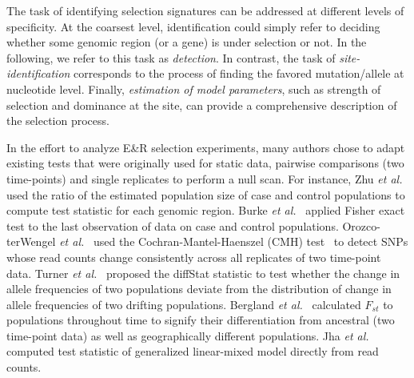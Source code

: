 \documentclass[9pt,twocolumn,twoside]{gsajnl}
\begin{document}
The task of identifying selection signatures can be addressed at
different levels of specificity. At the coarsest level, identification
could simply refer to deciding whether some genomic region (or a gene)
is under selection or not. In the following, we refer to this task as
\emph{detection}. In contrast, the task of \emph{site-identification}
corresponds to the process of finding the favored mutation/allele at
nucleotide level. Finally, \emph{estimation of model parameters}, such
as strength of selection and dominance at the site, can provide a
comprehensive description of the selection process.


In the effort to analyze E\&R selection experiments, many authors
chose to adapt existing tests that were originally used for static
data, pairwise comparisons (two time-points) and single replicates to
perform a null scan.  For instance, Zhu \emph{et
	al.}~\cite{zhou2011experimental} used the ratio of the estimated
population size of case and control populations to compute test
statistic for each genomic region. Burke \emph{et
	al.}~\cite{burke2010genome} applied Fisher exact test to the last
observation of data on case and control populations.  Orozco-terWengel
\emph{et al.}~\cite{orozco2012adaptation} used the
Cochran-Mantel-Haenszel (CMH) test~\cite{agresti2011categorical} to
detect SNPs whose read counts change consistently across all
replicates of two time-point data. Turner \emph{et
	al.}~\cite{turner2011population} proposed the diffStat statistic to
test whether the change in allele frequencies of two populations
deviate from the distribution of change in allele frequencies of two
drifting populations. Bergland \emph{et
	al.}~\cite{bergland2014genomic} calculated $F_{st}$ to populations
throughout time to signify their differentiation from ancestral (two
time-point data) as well as geographically different populations. Jha
\emph{et al.}~\cite{jha2015whole} computed test statistic of
generalized linear-mixed model directly from read counts.
\end{document}
